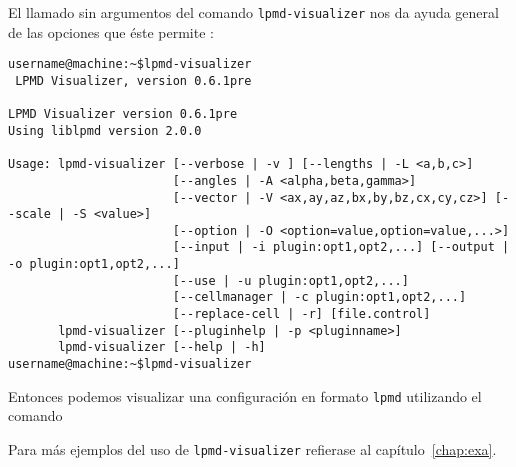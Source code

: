 El llamado sin argumentos del comando \verb|lpmd-visualizer| nos da ayuda general de las opciones que \'este permite :

\begin{verbatim}
username@machine:~$lpmd-visualizer
 LPMD Visualizer, version 0.6.1pre

LPMD Visualizer version 0.6.1pre
Using liblpmd version 2.0.0

Usage: lpmd-visualizer [--verbose | -v ] [--lengths | -L <a,b,c>]
                       [--angles | -A <alpha,beta,gamma>]
                       [--vector | -V <ax,ay,az,bx,by,bz,cx,cy,cz>] [--scale | -S <value>]
                       [--option | -O <option=value,option=value,...>]
                       [--input | -i plugin:opt1,opt2,...] [--output | -o plugin:opt1,opt2,...]
                       [--use | -u plugin:opt1,opt2,...]
                       [--cellmanager | -c plugin:opt1,opt2,...]
                       [--replace-cell | -r] [file.control]
       lpmd-visualizer [--pluginhelp | -p <pluginname>]
       lpmd-visualizer [--help | -h]
username@machine:~$lpmd-visualizer
\end{verbatim}

Entonces podemos visualizar una configuraci\'on en formato \verb|lpmd| utilizando el comando


Para m\'as ejemplos del uso de \verb|lpmd-visualizer| refierase al cap\'itulo~\ref{chap:exa}.
